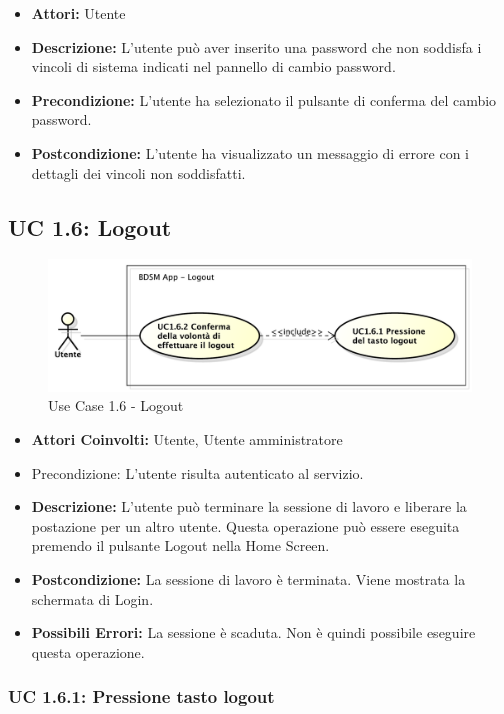 \begin{itemize}
    \item \textbf{Attori:} Utente
    \item \textbf{Descrizione:} L'utente può aver inserito una password che non soddisfa i vincoli di sistema indicati nel pannello di cambio password.
    \item \textbf{Precondizione:} L'utente ha selezionato il pulsante di conferma del cambio password.
    \item \textbf{Postcondizione:} L'utente ha visualizzato un messaggio di errore con i dettagli dei vincoli non soddisfatti.
\end{itemize}

\subsection{UC 1.6: Logout}

\begin{figure}[htbp]
    \centering
    \centerline{\includegraphics[scale=0.5]{./images/UC1_6.pdf}}
    \caption{Use Case 1.6 - Logout}
\end{figure}

\begin{itemize}
    \item \textbf{Attori Coinvolti:} Utente, Utente amministratore
    \item {Precondizione:} L'utente risulta autenticato al servizio.
    \item \textbf{Descrizione:} L'utente può terminare la sessione di lavoro e liberare la postazione per un altro utente. Questa operazione può essere eseguita premendo il pulsante Logout nella Home Screen.
    \item \textbf{Postcondizione:} La sessione di lavoro è terminata. Viene mostrata la schermata di Login.
    \item \textbf{Possibili Errori:} La sessione è scaduta. Non è quindi possibile eseguire questa operazione.
\end{itemize}

\subsubsection{UC 1.6.1: Pressione tasto logout}

